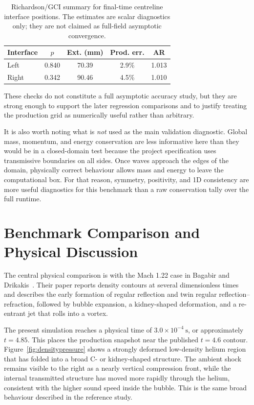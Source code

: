 \documentclass[final,3p,times,twocolumn]{elsarticle}
\begin{document}
\begin{table}[t]
\centering
\caption{Richardson/GCI summary for final-time centreline interface positions. The estimates are scalar diagnostics only; they are not claimed as full-field asymptotic convergence.}
\label{tab:interface_richardson}
\small
\setlength{\tabcolsep}{3pt}
\begin{tabular}{lcccc}
\toprule
Interface & $p$ & Ext. (mm) & Prod. err. & AR \\
\midrule
Left & 0.840 & 70.39 & 2.9\% & 1.013 \\
Right & 0.342 & 90.46 & 4.5\% & 1.010 \\
\bottomrule
\end{tabular}
\normalsize
\end{table}

These checks do not constitute a full asymptotic accuracy study, but they are strong enough to support the later regression comparisons and to justify treating the production grid as numerically useful rather than arbitrary.

It is also worth noting what is \emph{not} used as the main validation diagnostic. Global mass, momentum, and energy conservation are less informative here than they would be in a closed-domain test because the project specification uses transmissive boundaries on all sides. Once waves approach the edges of the domain, physically correct behaviour allows mass and energy to leave the computational box. For that reason, symmetry, positivity, and 1D consistency are more useful diagnostics for this benchmark than a raw conservation tally over the full runtime.

\section{Benchmark Comparison and Physical Discussion}

The central physical comparison is with the Mach 1.22 case in Bagabir and Drikakis~\cite{bagabir2001}. Their paper reports density contours at several dimensionless times and describes the early formation of regular reflection and twin regular reflection--refraction, followed by bubble expansion, a kidney-shaped deformation, and a re-entrant jet that rolls into a vortex.

The present simulation reaches a physical time of $3.0 \times 10^{-4}~\mathrm{s}$, or approximately $t = 4.85$. This places the production snapshot near the published $t = 4.6$ contour. Figure~\ref{fig:densitypressure} shows a strongly deformed low-density helium region that has folded into a broad C- or kidney-shaped structure. The ambient shock remains visible to the right as a nearly vertical compression front, while the internal transmitted structure has moved more rapidly through the helium, consistent with the higher sound speed inside the bubble. This is the same broad behaviour described in the reference study.
\end{document}
